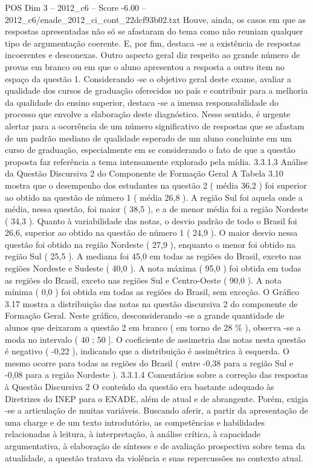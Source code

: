 \begin{textsample}{POS Dim 3 – 2012\_c6 – Score -6.00 – 2012\_c6/enade\_2012\_ci\_cont\_22dcf93b02.txt}
Houve, ainda, os casos em que as respostas apresentadas não só se afastaram do tema como não reuniam qualquer tipo de argumentação coerente.
E, por fim, destaca -se a existência de respostas incoerentes e desconexas.
Outro aspecto geral diz respeito ao grande número de provas em branco ou em que o aluno apresentou a resposta a outro item no espaço da questão 1.
Considerando -se o objetivo geral deste exame, avaliar a qualidade dos cursos de graduação oferecidos no país e contribuir para a melhoria da qualidade do ensino superior, destaca -se a imensa responsabilidade do processo que envolve a elaboração deste diagnóstico.
Nesse sentido, é urgente alertar para a ocorrência de um número significativo de respostas que se afastam de um padrão mediano de qualidade esperado de um aluno concluinte em um curso de graduação, especialmente em se considerando o fato de que a questão proposta faz referência a tema intensamente explorado pela mídia. 3.3.1.3 Análise da Questão Discursiva 2 do Componente de Formação Geral A Tabela 3.10 mostra que o desempenho dos estudantes na questão 2 ( média 36,2 ) foi superior ao obtido na questão de número 1 ( média 26,8 ).
A região Sul foi aquela onde a média, nessa questão, foi maior ( 38,5 ), e a de menor média foi a região Nordeste ( 34,3 ).
Quanto à variabilidade das notas, o desvio padrão de todo o Brasil foi 26,6, superior ao obtido na questão de número 1 ( 24,9 ).
O maior desvio nessa questão foi obtido na região Nordeste ( 27,9 ), enquanto o menor foi obtido na região Sul ( 25,5 ).
A mediana foi 45,0 em todas as regiões do Brasil, exceto nas regiões Nordeste e Sudeste ( 40,0 ).
A nota máxima ( 95,0 ) foi obtida em todas as regiões do Brasil, exceto nas regiões Sul e Centro-Oeste ( 90,0 ).
A nota mínima ( 0,0 ) foi obtida em todas as regiões do Brasil, sem exceção.
O Gráfico 3.17 mostra a distribuição das notas na questão discursiva 2 do componente de Formação Geral.
Neste gráfico, desconsiderando -se a grande quantidade de alunos que deixaram a questão 2 em branco ( em torno de 28 \% ), observa -se a moda no intervalo ( 40 ; 50 ].
O coeficiente de assimetria das notas nesta questão é negativo ( -0,22 ), indicando que a distribuição é assimétrica à esquerda.
O mesmo ocorre para todas as regiões do Brasil ( entre -0,38 para a região Sul e -0,08 para a região Nordeste ). 3.3.1.4 Comentários sobre a correção das respostas à Questão Discursiva 2 O conteúdo da questão era bastante adequado às Diretrizes do INEP para o ENADE, além de atual e de abrangente.
Porém, exigia -se a articulação de muitas variáveis.
Buscando aferir, a partir da apresentação de uma charge e de um texto introdutório, as competências e habilidades relacionadas à leitura, à interpretação, à análise crítica, à capacidade argumentativa, à elaboração de sínteses e de avaliação prospectiva sobre tema da atualidade, a questão tratava da violência e suas repercussões no contexto atual.

\end{textsample}
